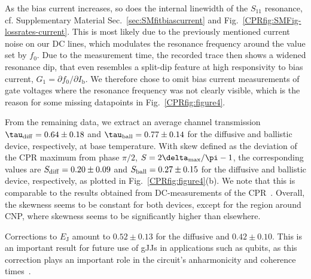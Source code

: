 As the bias current increases, so does the internal linewidth of the $S_{11}$ resonance, cf. Supplementary Material Sec.~\ref{sec:SMfitbiascurrent} and Fig.~\ref{CPRfig:SMFig-lossrates-current}.
%
This is most likely due to the previously mentioned current noise on our DC lines, which modulates the resonance frequency around the value set by $f_0$.
%
Due to the measurement time, the recorded trace then shows a widened resonance dip, that even resembles a split-dip feature at high responsivity to bias current, $G_1=\partial f_0/\partial I_\text{b}$.
%
We therefore chose to omit bias current measurements of gate voltages where the resonance frequency was not clearly visible, which is the reason for some missing datapoints in Fig.~\ref{CPRfig:figure4}.

From the remaining data, we extract an average channel transmission $\tau_{\rm diff}=0.64\pm0.18$ and $\tau_{\rm ball}=0.77\pm0.14$ for the diffusive and ballistic device, respectively, at base temperature.
%
With skew defined as the deviation of the CPR maximum from phase $\pi/2$, $S=2\delta_{\rm max}/\pi -1$, the corresponding values are $S_{\rm diff}=0.20\pm0.09$ and $S_{\rm ball}=0.27\pm0.15$ for the diffusive and ballistic device, respectively, as plotted in Fig.~\ref{CPRfig:figure4}(b).
%
We note that this is comparable to the results obtained from DC-measurements of the CPR~\cite{englishObservationNonsinusoidalCurrentphase2016,nandaCurrentPhaseRelationBallistic2017}.
%
Overall, the skewness seems to be constant for both devices, except for the region around CNP, where skewness seems to be significantly higher than elsewhere.





Corrections to $E_\text{J}$ amount to $0.52\pm0.13$ for the diffusive and $0.42\pm0.10$.
%
This is an important result for future use of gJJs in applications such as qubits, as this correction plays an important role in the circuit's anharmonicity and coherence times~\cite{kringhojAnharmonicitySuperconductingQubit2018}.

